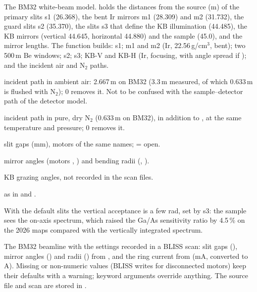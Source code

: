 The BM32 white-beam model.  holds the distances from the source (m) of the
primary slits s1 (26.368), the bent Ir mirrors m1 (28.309) and m2 (31.732), the guard slits s2
(35.370), the slits s3 that define the KB illumination (44.485), the KB mirrors (vertical
44.645, horizontal 44.880) and the sample (45.0), and the mirror lengths. The function builds:
s1; m1 and m2 (Ir, 22.56\,g/cm$^3$, bent); two 500\,\textmu m Be windows; s2; s3; KB-V and KB-H
(Ir, focusing, with angle spread if ); and the incident air and N$_2$ paths.
\begin{args}
\item[air\_path\_m] incident path in ambient air: 2.667\,m on BM32 (3.3\,m measured, of
  which 0.633\,m is flushed with N$_2$); 0 removes it. Not to be confused with the
  sample--detector path of the detector model.
\item[n2\_path\_m] incident path in pure, dry N$_2$ (0.633\,m on BM32), in addition to
  , at the same temperature and pressure; 0 removes it.
\item[vg1 \dots\ hg3] slit gaps (mm), motors of the same names;  = open.
\item[m1\_angle\_mrad, m2\_angle\_mrad, m1\_radius\_km, m2\_radius\_km] mirror angles
  (motors , ) and bending radii (, ).
\item[kbv\_angle\_mrad, kbh\_angle\_mrad] KB grazing angles, not recorded in the scan files.
\item[others] as in  and .
\end{args}
With the default slits the vertical acceptance is a few \textmu rad, set by s3: the sample sees
the on-axis spectrum, which raised the Ga/As sensitivity ratio by 4.5\,\% on the 2026 maps
compared with the vertically integrated spectrum.

The BM32 beamline with the settings recorded in a BLISS scan: slit gaps
(), mirror angles () and radii () from
, and the ring current from
 (mA, converted to A). Missing or non-numeric values
(BLISS writes  for disconnected motors) keep their defaults with a warning; keyword
arguments override anything. The source file and scan are stored in .
